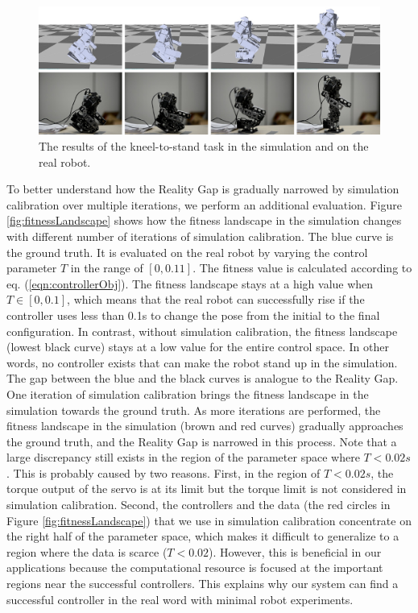 \begin{figure}[!t]
  \centering
  \includegraphics[width=\textwidth]{figures/kneel2Stand}
  \caption{The results of the kneel-to-stand task in the simulation and on the real robot.}
  \label{fig:kneel2Stand}
\end{figure}

To better understand how the Reality Gap is gradually narrowed by simulation calibration over multiple iterations, we perform an additional evaluation. Figure \ref{fig:fitnessLandscape} shows how the fitness landscape in the simulation changes with different number of iterations of simulation calibration. The blue curve is the ground truth. It is evaluated on the real robot by varying the control parameter $T$ in the range of $[0, 0.11]$. The fitness value is calculated according to eq. (\ref{eqn:controllerObj}). The fitness landscape stays at a high value when $T\in[0, 0.1]$, which means that the real robot can successfully rise if the controller uses less than 0.1s to change the pose from the initial to the final configuration. In contrast, without simulation calibration, the fitness landscape (lowest black curve) stays at a low value for the entire control space. In other words, no controller exists that can make the robot stand up in the simulation. The gap between the blue and the black curves is analogue to the Reality Gap. One iteration of simulation calibration brings the fitness landscape in the simulation towards the ground truth. As more iterations are performed, the fitness landscape in the simulation (brown and red curves) gradually approaches the ground truth, and the Reality Gap is narrowed in this process. Note that a large discrepancy still exists in the region of the parameter space where $T<0.02s$. This is probably caused by two reasons. First, in the region of $T<0.02s$, the torque output of the servo is at its limit but the torque limit is not considered in simulation calibration. Second, the controllers and the data (the red circles in Figure \ref{fig:fitnessLandscape}) that we use in simulation calibration concentrate on the right half of the parameter space, which makes it difficult to generalize to a region where the data is scarce ($T<0.02$). However, this is beneficial in our applications because the computational resource is focused at the important regions near the successful controllers. This explains why our system can find a successful controller in the real word with minimal robot experiments.


